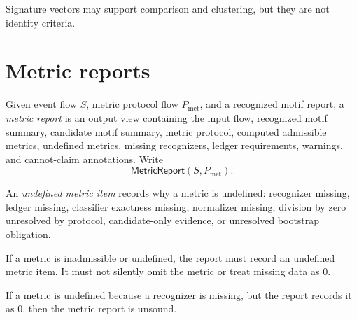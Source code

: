 \begin{corollary}
\label{cor:metric-report-signature-explanatory}
Signature vectors may support comparison and clustering, but they are not identity criteria.
\end{corollary}

\section{Metric reports}
\label{sec:metric-report-reports}

\begin{definition}
\label{def:metric-report-report}
Given event flow $S$, metric protocol flow $P_{\mathrm{met}}$, and a recognized motif report, a \emph{metric report} is an output view containing the input flow, recognized motif summary, candidate motif summary, metric protocol, computed admissible metrics, undefined metrics, missing recognizers, ledger requirements, warnings, and cannot-claim annotations. Write
$$
  \mathsf{MetricReport}(S,P_{\mathrm{met}}).
$$
\end{definition}

\begin{definition}
\label{def:metric-report-undefined-item}
An \emph{undefined metric item} records why a metric is undefined: recognizer missing, ledger missing, classifier exactness missing, normalizer missing, division by zero unresolved by protocol, candidate-only evidence, or unresolved bootstrap obligation.
\end{definition}

\begin{principle}
\label{prin:metric-report-undefined-explicit}
If a metric is inadmissible or undefined, the report must record an undefined metric item. It must not silently omit the metric or treat missing data as $0$.
\end{principle}

\begin{theorem}
\label{thm:metric-report-silent-zero-unsound}
If a metric is undefined because a recognizer is missing, but the report records it as $0$, then the metric report is unsound.
\end{theorem}

